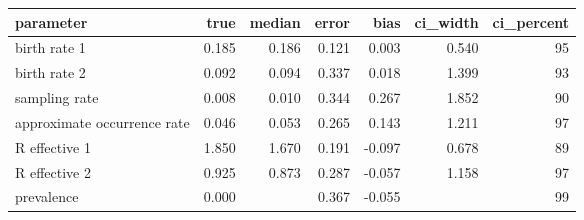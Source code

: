 \begin{table}[ht]
\centering
\begin{tabular}{lrrrrrr}
  \hline
parameter & true & median & error & bias & ci\_width & ci\_percent \\ 
  \hline
birth rate 1 & 0.185 & 0.186 & 0.121 & 0.003 & 0.540 & 95 \\ 
  birth rate 2 & 0.092 & 0.094 & 0.337 & 0.018 & 1.399 & 93 \\ 
  sampling rate & 0.008 & 0.010 & 0.344 & 0.267 & 1.852 & 90 \\ 
  approximate occurrence rate & 0.046 & 0.053 & 0.265 & 0.143 & 1.211 & 97 \\ 
  R effective 1 & 1.850 & 1.670 & 0.191 & -0.097 & 0.678 & 89 \\ 
  R effective 2 & 0.925 & 0.873 & 0.287 & -0.057 & 1.158 & 97 \\ 
  prevalence & 0.000 &  & 0.367 & -0.055 &  & 99 \\ 
   \hline
\end{tabular}
\end{table}
